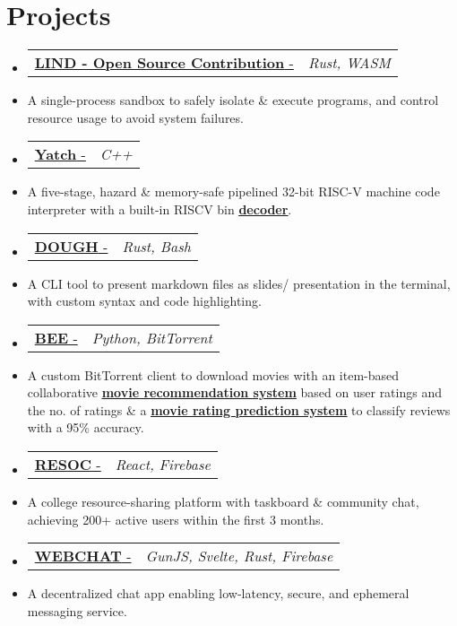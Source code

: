 \documentclass[letterpaper,10pt]{article}
\makeatletter
\newcommand{\resumeItem}[1]{
  \item\small{
    {#1 \vspace{-2pt}}
  }
}
\newcommand{\resumeProjectHeading}[2]{
    \item
    \begin{tabular*}{0.97\textwidth}{l@{\extracolsep{\fill}}r}
      \small#1 & \textit{\small #2} \\
    \end{tabular*}\vspace{-4 pt}
}
\newcommand{\resumeSubItem}[1]{\resumeItem{#1}\vspace{-4pt}}
\newcommand{\resumeSubHeadingListStart}{\begin{itemize}[leftmargin=0.15in, label={}]}
\newcommand{\resumeSubHeadingListEnd}{\end{itemize}}
\makeatother
\begin{document}


\section{Projects}
  \resumeSubHeadingListStart
  \resumeProjectHeading
    {\href{https://github.com/Lind-Project/lind_project}{\textbf{LIND - Open Source Contribution} - \faIcon{link}}}{Rust, WASM}
    \resumeSubItem
      {A single-process sandbox to safely isolate \& execute programs, and control resource usage to avoid system failures.}
\resumeProjectHeading
  {\href{https://github.com/fuzzymf/yatch}{\textbf{Yatch} - \faIcon{link}}}{C++}
    \resumeSubItem
      {A five-stage, hazard \& memory-safe pipelined 32-bit RISC-V machine code interpreter with a built-in RISCV bin {\href{https://anubhavp.dev/barney}{\underline{\textbf{decoder}}}}.}
  \resumeProjectHeading
    {\href{https://github.com/fuzzymf/dough}{\textbf{DOUGH} - \faIcon{link}}}{Rust, Bash}
    \resumeSubItem
      {A CLI tool to present markdown files as slides/ presentation in the terminal, with custom syntax and code highlighting.}
  \resumeProjectHeading
    {\href{https://github.com/fuzzymf/b}{{\textbf{BEE} - \faIcon{link} }}}{Python, BitTorrent}
    \resumeSubItem
      {A custom BitTorrent client to download movies with an item-based collaborative \href{https://github.com/fuzzymf/Movie-recommendation}{\underline{\textbf{ movie recommendation system}}} based on user ratings and the no. of ratings \& a \href{https://github.com/fuzzymf/Movie-rating-prediction}{\underline{\textbf{movie rating prediction system}}} to classify reviews with a 95\% accuracy.}
  \resumeProjectHeading
    {\href{https://github.com/fuzzymf/resoc}{\textbf{RESOC} - \faIcon{link} }}{React, Firebase}
    \resumeSubItem
      {A college resource-sharing platform with taskboard \& community chat, achieving 200+ active users within the first 3 months.}
    \resumeProjectHeading
    {\href{https://github.com/fuzzymf/w3bchat-dapp}{\textbf{WEBCHAT} - \faIcon{link}}}{GunJS, Svelte, Rust, Firebase}
    \resumeSubItem
      {A decentralized chat app enabling low-latency, secure, and ephemeral messaging service.}
  \resumeSubHeadingListEnd

%
\end{document}
